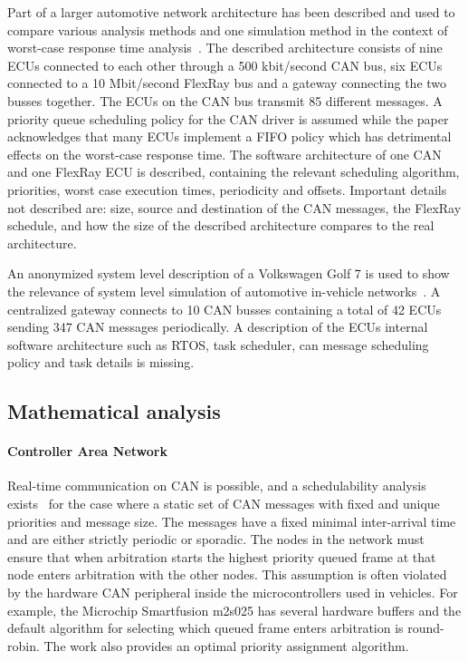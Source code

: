 Part of a larger automotive network architecture has been described and used to compare various analysis methods and one simulation method in the context of worst-case response time analysis~\cite{kollman2010comparative}. The described architecture consists of nine ECUs connected to each other through a 500 kbit/second CAN bus, six ECUs connected to a 10 Mbit/second FlexRay bus and a gateway connecting the two busses together. The ECUs on the CAN bus transmit 85 different messages. A priority queue scheduling policy for the CAN driver is assumed while the paper acknowledges that many ECUs implement a FIFO policy which has detrimental effects on the worst-case response time. The software architecture of one CAN and one FlexRay ECU is described, containing the relevant scheduling algorithm, priorities, worst case execution times, periodicity and offsets. Important details not described are: size, source and destination of the CAN messages, the FlexRay schedule, and how the size of the described architecture compares to the real architecture. 

An anonymized system level description of a Volkswagen Golf 7 is used to show the relevance of system level simulation of automotive in-vehicle networks~\cite{meyer2019simulation}. A centralized gateway connects to 10 CAN busses containing a total of 42 ECUs sending 347 CAN messages periodically. A description of the ECUs internal software architecture such as RTOS, task scheduler, can message scheduling policy and task details is missing.

\subsection{Mathematical analysis}
\paragraph{Controller Area Network}
Real-time communication on CAN is possible, and a schedulability analysis exists~\cite{davis2007controller} for the case where a static set of CAN messages with fixed and unique priorities and message size. The messages have a fixed minimal inter-arrival time and are either strictly periodic or sporadic. The nodes in the network must ensure that when arbitration starts the highest priority queued frame at that node enters arbitration with the other nodes. This assumption is often violated by the hardware CAN peripheral inside the microcontrollers used in vehicles. For example, the Microchip Smartfusion m2s025 has several hardware buffers and the default algorithm for selecting which queued frame enters arbitration is round-robin. The work also provides an optimal priority assignment algorithm.

